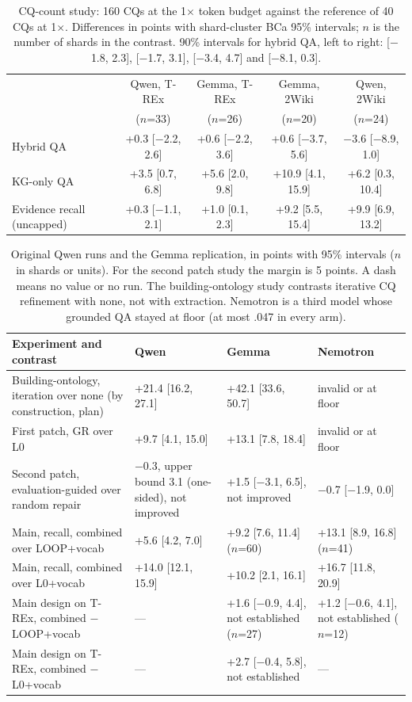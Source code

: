 \begin{table}[!t]
\centering
\caption{CQ-count study: 160 CQs at the 1$\times$ token budget against the reference of 40 CQs at 1$\times$. Differences in points with shard-cluster BCa 95\% intervals; $n$ is the number of shards in the contrast. 90\% intervals for hybrid QA, left to right: [$-$1.8, 2.3], [$-$1.7, 3.1], [$-$3.4, 4.7] and [$-$8.1, 0.3].}
\label{tab:exp9}
\footnotesize\setlength{\tabcolsep}{3.5pt}
\begin{tabular}{lcccc}
\toprule
 & Qwen, T-REx & Gemma, T-REx & Gemma, 2Wiki & Qwen, 2Wiki \\
 & ($n$=33) & ($n$=26) & ($n$=20) & ($n$=24) \\
\midrule
Hybrid QA & +0.3 [$-$2.2, 2.6] & +0.6 [$-$2.2, 3.6] & +0.6 [$-$3.7, 5.6] & $-$3.6 [$-$8.9, 1.0] \\
KG-only QA & +3.5 [0.7, 6.8] & +5.6 [2.0, 9.8] & +10.9 [4.1, 15.9] & +6.2 [0.3, 10.4] \\
Evidence recall (uncapped) & +0.3 [$-$1.1, 2.1] & +1.0 [0.1, 2.3] & +9.2 [5.5, 15.4] & +9.9 [6.9, 13.2] \\
\bottomrule
\end{tabular}
\end{table}

\begin{table}[!ht]
\centering
\caption{Original Qwen runs and the Gemma replication, in points with 95\% intervals ($n$ in shards or units). For the second patch study the margin is 5 points. A dash means no value or no run. The building-ontology study contrasts iterative CQ refinement with none, not with extraction. Nemotron is a third model whose grounded QA stayed at floor (at most .047 in every arm).}
\label{tab:replication}
\scriptsize\setlength{\tabcolsep}{3pt}
\begin{tabular}{P{4.6cm}P{3.9cm}P{4.7cm}P{3.9cm}}
\toprule
Experiment and contrast & Qwen & Gemma & Nemotron \\
\midrule
Building-ontology, iteration over none (by construction, plan) & +21.4 [16.2, 27.1] & +42.1 [33.6, 50.7] & invalid or at floor \\
First patch, GR over L0 & +9.7 [4.1, 15.0] & +13.1 [7.8, 18.4] & invalid or at floor \\
Second patch, evaluation-guided over random repair & $-$0.3, upper bound 3.1 (one-sided), not improved & +1.5 [$-$3.1, 6.5], not improved & $-$0.7 [$-$1.9, 0.0] \\
Main, recall, combined over LOOP+vocab & +5.6 [4.2, 7.0] & +9.2 [7.6, 11.4] ($n$=60) & +13.1 [8.9, 16.8] ($n$=41) \\
Main, recall, combined over L0+vocab & +14.0 [12.1, 15.9] & +10.2 [2.1, 16.1] & +16.7 [11.8, 20.9] \\
Main design on T-REx, combined $-$ LOOP+vocab & --- & +1.6 [$-$0.9, 4.4], not established ($n$=27) & +1.2 [$-$0.6, 4.1], not established ($n$=12) \\
Main design on T-REx, combined $-$ L0+vocab & --- & +2.7 [$-$0.4, 5.8], not established & --- \\
\bottomrule
\end{tabular}
\end{table}

